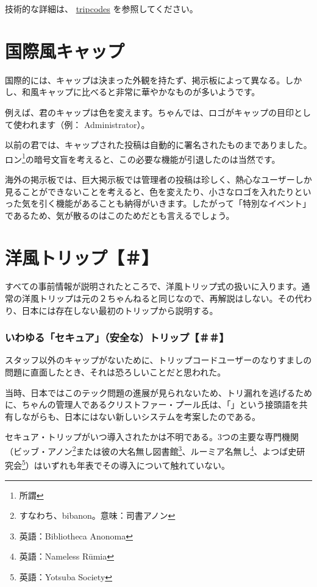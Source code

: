 \documentclass[lualatex, tate, landscape, paper=a4]{jlreq}
\newcommand{\yokoB}[1]{\hspace{0.1em}\hbox{\yoko \resizebox{1em}{0.66em}{#1}}\hspace{0.1em}}
\newcommand{\yokoN}[1]{\hbox{\yoko {#1}}\hspace{0.2em}}
\begin{document}
技術的な詳細は、 \href{https://docs.rs/tripcode/latest/tripcode/}{tripcodes} を参照してください。

\part{国際風キャップ}
国際的には、キャップは決まった外観を持たず、掲示板によって異なる。しかし、和風キャップに比べると非常に華やかなものが多いようです。

例えば、\yokoN{8}君のキャップは色を変えます。\yokoN{4}ちゃんでは、ロゴがキャップの目印として使われます（例： Administrator）。

以前の\yokoN{8}君では、キャップされた投稿は自動的に\yokoB{Gnu}\yokoB{PG}署名されたものまでありました。ロン\footnote{所謂\yokoB{CM}}の暗号文盲を考えると、この必要な機能が引退したのは当然です。

海外の掲示板では、巨大掲示板では管理者の投稿は珍しく、熱心なユーザーしか見ることができないことを考えると、色を変えたり、小さなロゴを入れたりといった気を引く機能があることも納得がいきます。したがって「特別なイベント」であるため、気が散るのはこのためだとも言えるでしょう。

\part{洋風トリップ【＃】}
すべての事前情報が説明されたところで、洋風トリップ式の扱いに入ります。通常の洋風トリップは元の２ちゃんねると同じなので、再解説はしない。その代わり、日本には存在しない最初のトリップから説明する。
\section{いわゆる「セキュア」（安全な）トリップ【＃＃】}
スタッフ以外のキャップがないために、トリップコードユーザーのなりすましの問題に直面したとき、それは恐ろしいことだと思われた。

当時、日本ではこのテック問題の進展が見られないため、トリ漏れを逃げるために、\yokoN{4}ちゃんの管理人であるクリストファー・プール氏は、「\yokoB{\#\#}」という接頭語を共有しながらも、日本にはない新しいシステムを考案したのである。

セキュア・トリップがいつ導入されたかは不明である。3つの主要な専門機関（ビッブ・アノン\footnote{すなわち、bibanon。意味：司書アノン}または彼の大名無し図書館\footnote{英語：Bibliotheca Anonoma}、ルーミア名無し\footnote{英語：Nameless Rūmia}、よつば史研究会\footnote{英語：Yotsuba Society}）はいずれも年表でその導入について触れていない。
\end{document}
